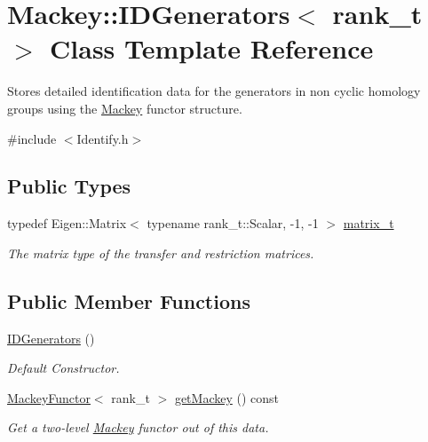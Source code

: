 \hypertarget{classMackey_1_1IDGenerators}{}\section{Mackey\+:\+:I\+D\+Generators$<$ rank\+\_\+t $>$ Class Template Reference}
\label{classMackey_1_1IDGenerators}


Stores detailed identification data for the generators in non cyclic homology groups using the \hyperlink{namespaceMackey}{Mackey} functor structure.  




{\ttfamily \#include $<$Identify.\+h$>$}

\subsection*{Public Types}
\begin{DoxyCompactItemize}
\item 
typedef Eigen\+::\+Matrix$<$ typename rank\+\_\+t\+::\+Scalar, -\/1, -\/1 $>$ \hyperlink{classMackey_1_1IDGenerators_a6b4c91c53aa7fe61ae93a716e891832f}{matrix\+\_\+t}
\begin{DoxyCompactList}\small\item\em The matrix type of the transfer and restriction matrices. \end{DoxyCompactList}\end{DoxyCompactItemize}
\subsection*{Public Member Functions}
\begin{DoxyCompactItemize}
\item 
\hyperlink{classMackey_1_1IDGenerators_ad4e041defebc49fb90c1e7d78b066cdf}{I\+D\+Generators} ()
\begin{DoxyCompactList}\small\item\em Default Constructor. \end{DoxyCompactList}\item 
\hyperlink{classMackey_1_1MackeyFunctor}{Mackey\+Functor}$<$ rank\+\_\+t $>$ \hyperlink{classMackey_1_1IDGenerators_a9669af6c07a9ed5a91a662aef6cda1ed}{get\+Mackey} () const
\begin{DoxyCompactList}\small\item\em Get a two-\/level \hyperlink{namespaceMackey}{Mackey} functor out of this data. \end{DoxyCompactList}\end{DoxyCompactItemize}
